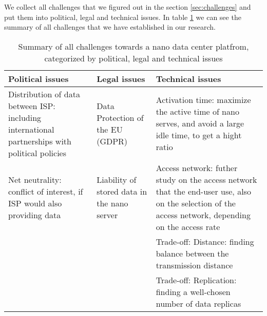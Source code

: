 We collect all challenges that we figured out in the section \ref{sec:challenges} and put them into political, legal and technical issues. In table \ref{tab:summary} we can see the summary of all challenges that we have established in our research. 

\begin{table}
\begin{minipage}{\columnwidth}
\begin{center}
\begin{tabular}{lll}
\toprule
Political issues & Legal issues & Technical issues \\
\hline
\parbox{.3\linewidth}{Distribution of data between ISP: including international partnerships with political policies} & \parbox{.3\linewidth}{Data Protection of the EU (GDPR)} & 
\parbox[c][2cm]{.3\linewidth}{Activation time: maximize the active time of nano serves, and avoid a large idle time, to get a hight ratio} \\
\hline

\parbox{.3\linewidth}{Net neutrality: conflict of interest, if ISP would also providing data} & 
\parbox{.3\linewidth}{Liability of stored data in the nano server} & 
\parbox[c][2.5cm]{.3\linewidth}{Access network: futher study on the access network that the end-user use, also on the selection of the access network, depending on the access rate} \\
\hline

\parbox{.3\linewidth}{} & 
\parbox{.3\linewidth}{} & 
\parbox[c][2cm]{.3\linewidth}{Trade-off: Distance: finding balance between the transmission distance} \\
\hline

\parbox{.3\linewidth}{} & 
\parbox{.3\linewidth}{} & 
\parbox[c][2cm]{.3\linewidth}{Trade-off: Replication: finding a well-chosen number of data replicas} \\				
\bottomrule
\end{tabular}
\end{center}
\bigskip\centering
\end{minipage}
\caption{Summary of all challenges towards a nano data center platfrom, categorized by political, legal and technical issues}\label{tab:summary}
\end{table}

